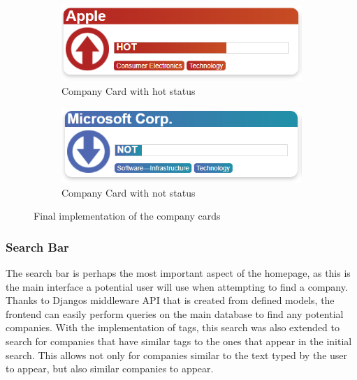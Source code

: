             \begin{figure}[!h]
            \begin{subfigure}[b]{0.5\textwidth}
                \includegraphics[width=\textwidth]{images/upload/card_hot.PNG}
                \caption{Company Card with hot status}
                \label{fig:card_hot}
            \end{subfigure}
            \hfill
            \begin{subfigure}[b]{0.5\textwidth}
                \includegraphics[width=\textwidth]{images/upload/card_not.png}
                \caption{Company Card with not status}
                \label{fig:card_not}
            \end{subfigure}
            \caption{Final implementation of the company cards}
            \label{fig:cards}
            \end{figure}
            
            \subsubsection{Search Bar}
            The search bar is perhaps the most important aspect of the homepage, as this is the main interface a potential user will use when attempting to find a company. Thanks to Djangos middleware API that is created from defined models, the frontend can easily perform queries on the main database to find any potential companies. With the implementation of tags, this search was also extended to search for companies that have similar tags to the ones that appear in the initial search. This allows not only for companies similar to the text typed by the user to appear, but also similar companies to appear.
            
